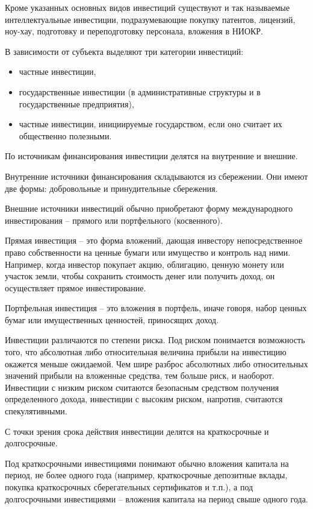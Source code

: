 Кроме указанных основных видов инвестиций существуют и так называемые
интеллектуальные инвестиции, подразумевающие покупку патентов, лицензий,
ноу-хау, подготовку и переподготовку персонала, вложения в НИОКР.

В зависимости от субъекта выделяют три категории инвестиций:
\begin{itemize}
    \item частные инвестиции,
    \item государственные инвестиции (в административные структуры и в
    государственные предприятия),
    \item частные инвестиции, инициируемые государством, если оно считает их
    общественно полезными.
\end{itemize}
По источникам финансирования инвестиции делятся на внутренние и внешние.

Внутренние источники финансирования складываются из сбережении. Они имеют две
формы: добровольные и принудительные сбережения.

Внешние источники инвестиций обычно приобретают форму международного
инвестирования -- прямого или портфельного (косвенного).

Прямая инвестиция -- это форма вложений, дающая инвестору непосредственное право
собственности на ценные бумаги или имущество и контроль над ними. Например,
когда инвестор покупает акцию, облигацию, ценную монету или участок земли,
чтобы сохранить стоимость денег или получить доход, он осуществляет прямое
инвестирование.

Портфельная инвестиция -- это вложения в портфель, иначе говоря, набор ценных
бумаг или имущественных ценностей, приносящих доход.

Инвестиции различаются по степени риска. Под риском понимается возможность
того, что абсолютная либо относительная величина прибыли на инвестицию окажется
меньше ожидаемой. Чем шире разброс абсолютных либо относительных значений
прибыли на вложенные средства, тем больше риск, и наоборот. Инвестиции с низким
риском считаются безопасным средством получения определенного дохода,
инвестиции с высоким риском, напротив, считаются спекулятивными.

С точки зрения срока действия инвестиции делятся на краткосрочные и
долгосрочные.

Под краткосрочными инвестициями понимают обычно вложения капитала на период, не
более одного года (например, краткосрочные депозитные вклады, покупка
краткосрочных сберегательных сертификатов и т.п.), а под долгосрочными
инвестициями -- вложения капитала на период свыше одного года.

